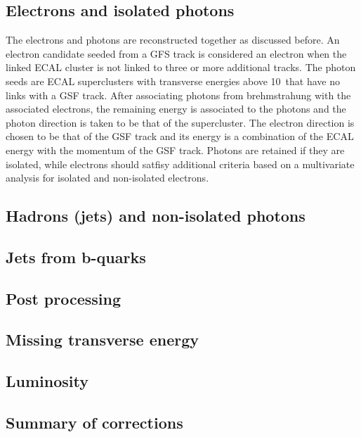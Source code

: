 \subsection{Electrons and isolated photons}
\label{sec:Electron}
The electrons and photons are reconstructed together as discussed before. An electron candidate seeded from a GFS track is considered an electron when the linked ECAL cluster is not linked to three or more additional tracks. The photon seeds are ECAL superclusters with transverse energies above 10\GeV\ that have no links with a GSF track. After associating photons from brehmstrahung with the associated electrons, the remaining energy is associated to the photons and the photon direction is taken to be that of the supercluster. The electron direction is chosen to be that of the GSF track and its energy is a combination of the ECAL energy with the momentum of the GSF track. Photons are retained if they are isolated, while electrons should satfisy additional criteria based on a multivariate analysis for isolated and non-isolated electrons. 
\subsection{Hadrons (jets) and non-isolated photons}
\label{sec:Hadron}
\subsection{Jets from b-quarks}
\label{sec:bJets}
\subsection{Post processing}
\label{sec:Postprocess}
\subsection{Missing transverse energy}

\subsection{Luminosity}

\subsection{Summary of corrections}

